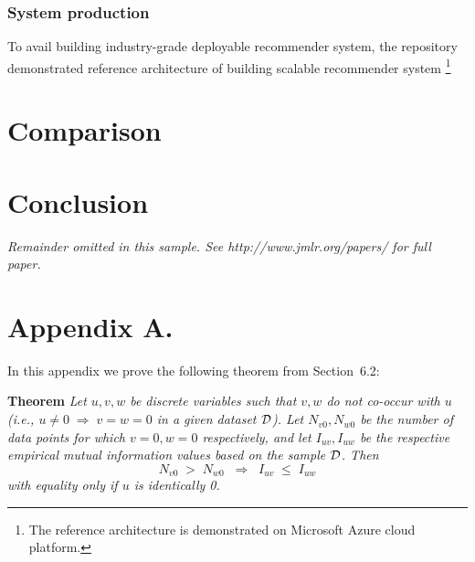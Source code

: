 \documentclass[twoside,11pt]{article}
\newcommand{\dataset}{{\cal D}}
\begin{document}
\subsubsection{System production}
To avail building industry-grade deployable recommender system, the repository demonstrated reference architecture of building scalable recommender system \footnote{The reference architecture is demonstrated on Microsoft Azure cloud platform.}

\section{Comparison}

\section{Conclusion}

{\noindent \em Remainder omitted in this sample. See http://www.jmlr.org/papers/ for full paper.}




\newpage

\appendix
\section*{Appendix A.}
\label{app:theorem}



In this appendix we prove the following theorem from
Section~6.2:

\noindent
{\bf Theorem} {\it Let $u,v,w$ be discrete variables such that $v, w$ do
not co-occur with $u$ (i.e., $u\neq0\;\Rightarrow \;v=w=0$ in a given
dataset $\dataset$). Let $N_{v0},N_{w0}$ be the number of data points for
which $v=0, w=0$ respectively, and let $I_{uv},I_{uw}$ be the
respective empirical mutual information values based on the sample
$\dataset$. Then
\[
	N_{v0} \;>\; N_{w0}\;\;\Rightarrow\;\;I_{uv} \;\leq\;I_{uw}
\]
with equality only if $u$ is identically 0.} \hfill\BlackBox
\end{document}
